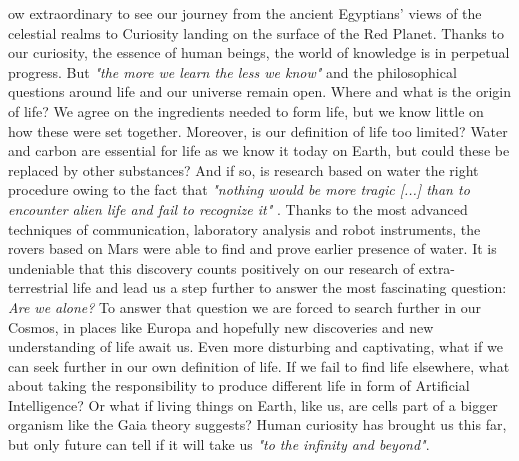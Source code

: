 ow extraordinary to see our journey from the ancient Egyptians' views of the celestial realms to Curiosity landing on the surface of the Red Planet. 
Thanks to our curiosity, the essence of human beings, the world of knowledge is in perpetual progress. 
But \emph{"the more we learn the less we know"} and the philosophical questions around life and our universe remain open.
Where and what is the origin of life? 
We agree on the ingredients needed to form life, but we know little on how these were set together. 
Moreover, is our definition of life too limited? 
Water and carbon are essential for life as we know it today on Earth, but could these be replaced by other substances? 
And if so, is research based on water the right procedure owing to the fact that \emph{"nothing would be more tragic [...] than to encounter alien life and fail to recognize it"} \cite{OForm3}. 
Thanks to the most advanced techniques of communication, laboratory analysis and robot instruments, the rovers based on Mars were able to find and prove earlier presence of water.
It is undeniable that this discovery counts positively on our research of extra-terrestrial life and lead us a step further to answer the most fascinating question: \emph{Are we alone?} 
To answer that question we are forced to search further in our Cosmos, in places like Europa and hopefully new discoveries and new understanding of life await us. 
Even more disturbing and captivating, what if we can seek further in our own definition of life. 
If we fail to find life elsewhere, what about taking the responsibility to produce different life in form of Artificial Intelligence? 
Or what if living things on Earth, like us, are cells part of a bigger organism like the Gaia theory suggests?
Human curiosity has brought us this far, but only future can tell if it will take us \emph{"to the infinity and beyond"}.